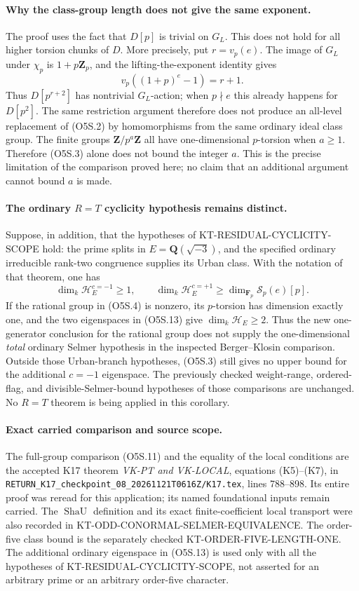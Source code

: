 \paragraph{Why the class-group length does not give the same exponent.}
The proof uses the fact that $D[p]$ is trivial on $G_L$.
This does not hold for all higher torsion chunks of $D$.
More precisely, put $r=v_p(e)$.  The image of $G_L$ under
$\chi_p$ is $1+p\mathbf Z_p$, and the lifting-the-exponent
identity gives
\[
                  v_p((1+p)^e-1)=r+1.
 \tag{O5S.12}
\]
Thus $D[p^{r+2}]$ has nontrivial $G_L$-action; when $p\nmid e$
this already happens for $D[p^2]$.
The same restriction argument therefore does not produce an
all-level replacement of (O5S.2) by homomorphisms from the same
ordinary ideal class group.
The finite groups $\mathbf Z/p^a\mathbf Z$ all have
one-dimensional $p$-torsion when $a\ge1$.
Therefore (O5S.3) alone does not bound the integer $a$.
This is the precise limitation of the comparison proved here;
no claim that an additional argument cannot bound $a$ is made.

\paragraph{The ordinary $R=T$ cyclicity hypothesis remains distinct.}
Suppose, in addition, that the hypotheses of
KT-RESIDUAL-CYCLICITY-SCOPE hold: the prime splits in
$E=\mathbf Q(\sqrt{-3})$, and the specified ordinary
irreducible rank-two congruence supplies its Urban class.
With the notation of that theorem, one has
\[
 \dim_k\mathcal H_E^{c=-1}\ge1,
 \qquad
 \dim_k\mathcal H_E^{c=+1}
        \ge\dim_{\mathbf F_p}\mathcal S_p(e)[p].
 \tag{O5S.13}
\]
If the rational group in (O5S.4) is nonzero, its $p$-torsion
has dimension exactly one, and the two eigenspaces in
(O5S.13) give $\dim_k\mathcal H_E\ge2$.
Thus the new one-generator conclusion for the rational
group does not supply the one-dimensional \emph{total}
ordinary Selmer hypothesis in the inspected Berger--Klosin
comparison.  Outside those Urban-branch hypotheses,
(O5S.3) still gives no upper bound for the additional
$c=-1$ eigenspace.  The previously checked weight-range,
ordered-flag, and divisible-Selmer-bound hypotheses of
those comparisons are unchanged.  No $R=T$ theorem is
being applied in this corollary.

\paragraph{Exact carried comparison and source scope.}
The full-group comparison (O5S.11) and the equality of
the local conditions are the accepted K17 theorem
\emph{VK-PT and VK-LOCAL}, equations (K5)--(K7), in
\texttt{RETURN\_K17\_checkpoint\_08\_20261121T0616Z/K17.tex},
lines 788--898.  Its entire proof was reread for this
application; its named foundational inputs remain carried.
The $\operatorname{ShaU}$ definition and its exact
finite-coefficient local transport were also recorded in
KT-ODD-CONORMAL-SELMER-EQUIVALENCE.
The order-five class bound is the separately checked
KT-ORDER-FIVE-LENGTH-ONE.  The additional ordinary
eigenspace in (O5S.13) is used only with all the hypotheses
of KT-RESIDUAL-CYCLICITY-SCOPE, not asserted for an arbitrary
prime or an arbitrary order-five character.

